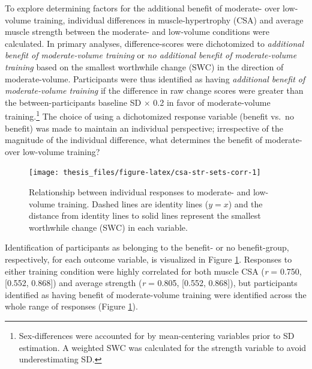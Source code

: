 \documentclass[twoside,10pt]{gihclass} %
\begin{document}
To explore determining factors for the additional benefit of moderate- over low-volume training, individual differences in muscle-hypertrophy (CSA) and average muscle strength between the moderate- and low-volume conditions were calculated. In primary analyses, difference-scores were dichotomized to \emph{additional benefit of moderate-volume training} or \emph{no additional benefit of moderate-volume training} based on the smallest worthwhile change (SWC) in the direction of moderate-volume. Participants were thus identified as having \emph{additional benefit of moderate-volume training} if the difference in raw change scores were greater than the between-participants baseline SD \(\times\) 0.2 in favor of moderate-volume training.\footnote{Sex-differences were accounted for by mean-centering variables prior to SD estimation. A weighted SWC was calculated for the strength variable to avoid underestimating SD.}
The choice of using a dichotomized response variable (benefit vs.~no benefit) was made to maintain an individual perspective; irrespective of the magnitude of the individual difference, what determines the benefit of moderate- over low-volume training?
\begin{figure}

{\centering \texttt{[image: thesis\_files/figure-latex/csa-str-sets-corr-1]} 

}

\caption[Relationship between individual responses to moderate- and low-volume training]{Relationship between individual responses to moderate- and low-volume training. Dashed lines are identity lines ($y = x$) and the distance from identity lines to solid lines represent the smallest worthwhile change (SWC) in each variable.}\label{fig:csa-str-sets-corr}
\end{figure}
Identification of participants as belonging to the benefit- or no benefit-group, respectively, for each outcome variable, is visualized in Figure \ref{fig:csa-str-sets-corr}. Responses to either training condition were highly correlated for both muscle CSA (\emph{r} = 0.750, {[}0.552, 0.868{]}) and average strength (\emph{r} = 0.805, {[}0.552, 0.868{]}), but participants identified as having benefit of moderate-volume training were identified across the whole range of responses (Figure \ref{fig:csa-str-sets-corr}).
\end{document}
